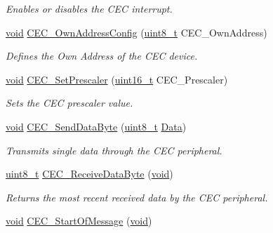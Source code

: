 \begin{DoxyCompactItemize}
\begin{DoxyCompactList}\small\item\em Enables or disables the C\-E\-C interrupt. \end{DoxyCompactList}\item 
\hyperlink{group___n_a_m_e_ga18028b8badbf1ea7e704ccac3c488e82}{void} \hyperlink{group___c_e_c___exported___functions_gacad422ef1f50246b2021b41835b8a95c}{C\-E\-C\-\_\-\-Own\-Address\-Config} (\hyperlink{stdint_8h_aba7bc1797add20fe3efdf37ced1182c5}{uint8\-\_\-t} C\-E\-C\-\_\-\-Own\-Address)
\begin{DoxyCompactList}\small\item\em Defines the Own Address of the C\-E\-C device. \end{DoxyCompactList}\item 
\hyperlink{group___n_a_m_e_ga18028b8badbf1ea7e704ccac3c488e82}{void} \hyperlink{group___c_e_c___exported___functions_gad2fc626e28a82008a29f062975a9af11}{C\-E\-C\-\_\-\-Set\-Prescaler} (\hyperlink{stdint_8h_a273cf69d639a59973b6019625df33e30}{uint16\-\_\-t} C\-E\-C\-\_\-\-Prescaler)
\begin{DoxyCompactList}\small\item\em Sets the C\-E\-C prescaler value. \end{DoxyCompactList}\item 
\hyperlink{group___n_a_m_e_ga18028b8badbf1ea7e704ccac3c488e82}{void} \hyperlink{group___c_e_c___exported___functions_ga6897ab26d8f909f9160e9fac54b97441}{C\-E\-C\-\_\-\-Send\-Data\-Byte} (\hyperlink{stdint_8h_aba7bc1797add20fe3efdf37ced1182c5}{uint8\-\_\-t} \hyperlink{group___copter_control_b_l_ga6f3335509cc4943e20df66f72483910c}{Data})
\begin{DoxyCompactList}\small\item\em Transmits single data through the C\-E\-C peripheral. \end{DoxyCompactList}\item 
\hyperlink{stdint_8h_aba7bc1797add20fe3efdf37ced1182c5}{uint8\-\_\-t} \hyperlink{group___c_e_c___exported___functions_ga165837bff6292e7674eff6f8b230da97}{C\-E\-C\-\_\-\-Receive\-Data\-Byte} (\hyperlink{group___n_a_m_e_ga18028b8badbf1ea7e704ccac3c488e82}{void})
\begin{DoxyCompactList}\small\item\em Returns the most recent received data by the C\-E\-C peripheral. \end{DoxyCompactList}\item 
\hyperlink{group___n_a_m_e_ga18028b8badbf1ea7e704ccac3c488e82}{void} \hyperlink{group___c_e_c___exported___functions_ga71e700461ffe7820d9e1c75da65fd0fb}{C\-E\-C\-\_\-\-Start\-Of\-Message} (\hyperlink{group___n_a_m_e_ga18028b8badbf1ea7e704ccac3c488e82}{void})

\end{DoxyCompactItemize}
